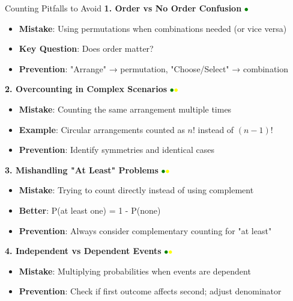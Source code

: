 \documentclass{article}
\begin{document}
\begin{trapbox}{Counting Pitfalls to Avoid}
\textbf{1. Order vs No Order Confusion} \textcolor{green}{$\bullet$}
\begin{itemize}[nosep]
\item \textbf{Mistake}: Using permutations when combinations needed (or vice versa)
\item \textbf{Key Question}: Does order matter?
\item \textbf{Prevention}: "Arrange" → permutation, "Choose/Select" → combination
\end{itemize}

\textbf{2. Overcounting in Complex Scenarios} \textcolor{green}{$\bullet$}\textcolor{yellow}{$\bullet$}
\begin{itemize}[nosep]
\item \textbf{Mistake}: Counting the same arrangement multiple times
\item \textbf{Example}: Circular arrangements counted as $n!$ instead of $(n-1)!$
\item \textbf{Prevention}: Identify symmetries and identical cases
\end{itemize}

\textbf{3. Mishandling "At Least" Problems} \textcolor{green}{$\bullet$}\textcolor{yellow}{$\bullet$}
\begin{itemize}[nosep]
\item \textbf{Mistake}: Trying to count directly instead of using complement
\item \textbf{Better}: P(at least one) = 1 - P(none)
\item \textbf{Prevention}: Always consider complementary counting for "at least"
\end{itemize}

\textbf{4. Independent vs Dependent Events} \textcolor{green}{$\bullet$}\textcolor{yellow}{$\bullet$}
\begin{itemize}[nosep]
\item \textbf{Mistake}: Multiplying probabilities when events are dependent
\item \textbf{Prevention}: Check if first outcome affects second; adjust denominator
\end{itemize}


\end{trapbox}
\end{document}
